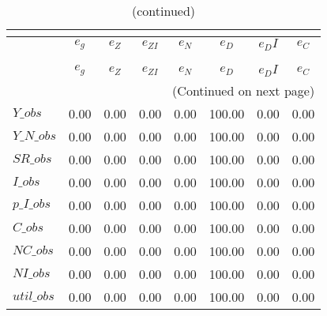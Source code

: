  
\begin{center}
\begin{longtable}{lccccccc} 
\caption{VARIANCE DECOMPOSITION (in percent)}\\
 \label{Table:th_var_decomp_uncond}\\
\toprule 
$           $	 & 	 $       {e_g}$	 & 	 $       {e_Z}$	 & 	 $    {e_{ZI}}$	 & 	 $       {e_N}$	 & 	 $       {e_D}$	 & 	 $      {e_DI}$	 & 	 $       {e_C}$\\
\midrule \endfirsthead 
\caption{(continued)}\\
 \toprule \\ 
$           $	 & 	 $       {e_g}$	 & 	 $       {e_Z}$	 & 	 $    {e_{ZI}}$	 & 	 $       {e_N}$	 & 	 $       {e_D}$	 & 	 $      {e_DI}$	 & 	 $       {e_C}$\\
\midrule \endhead 
\midrule \multicolumn{8}{r}{(Continued on next page)} \\ \bottomrule \endfoot 
\bottomrule \endlastfoot 
$Y\_obs     $	 & 	        0.00	 & 	        0.00	 & 	        0.00	 & 	        0.00	 & 	      100.00	 & 	        0.00	 & 	        0.00 \\ 
$Y\_N\_obs  $	 & 	        0.00	 & 	        0.00	 & 	        0.00	 & 	        0.00	 & 	      100.00	 & 	        0.00	 & 	        0.00 \\ 
$SR\_obs    $	 & 	        0.00	 & 	        0.00	 & 	        0.00	 & 	        0.00	 & 	      100.00	 & 	        0.00	 & 	        0.00 \\ 
$I\_obs     $	 & 	        0.00	 & 	        0.00	 & 	        0.00	 & 	        0.00	 & 	      100.00	 & 	        0.00	 & 	        0.00 \\ 
$p\_I\_obs  $	 & 	        0.00	 & 	        0.00	 & 	        0.00	 & 	        0.00	 & 	      100.00	 & 	        0.00	 & 	        0.00 \\ 
$C\_obs     $	 & 	        0.00	 & 	        0.00	 & 	        0.00	 & 	        0.00	 & 	      100.00	 & 	        0.00	 & 	        0.00 \\ 
$NC\_obs    $	 & 	        0.00	 & 	        0.00	 & 	        0.00	 & 	        0.00	 & 	      100.00	 & 	        0.00	 & 	        0.00 \\ 
$NI\_obs    $	 & 	        0.00	 & 	        0.00	 & 	        0.00	 & 	        0.00	 & 	      100.00	 & 	        0.00	 & 	        0.00 \\ 
$util\_obs  $	 & 	        0.00	 & 	        0.00	 & 	        0.00	 & 	        0.00	 & 	      100.00	 & 	        0.00	 & 	        0.00 \\ 

\end{longtable}
\end{center}
